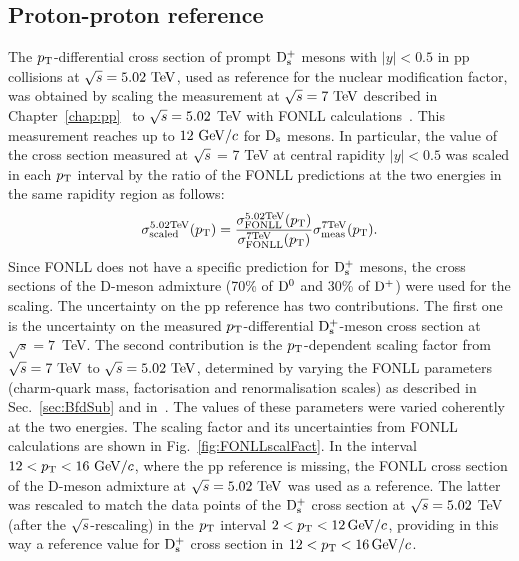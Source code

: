 \subsection{Proton-proton reference}
\label{sec:PPrefSyst}
The $p_{\rm T}$-differential cross section of prompt ${\rm D_s^+}$ mesons with 
$|y|<0.5$ in pp collisions at $\sqrt s=5.02~\mathrm{TeV}$, used as reference 
for the nuclear modification factor, was obtained by scaling the 
measurement at $\sqrt{s}=7~\mathrm{TeV}$ described in 
Chapter~\ref{chap:pp}~\cite{Acharya:2017jgo} to $\sqrt{s} = 5.02$ TeV 
with FONLL calculations~\cite{Cacciari:2012ny}. 
This measurement 
reaches up to $12~\mathrm{GeV}/c$ for ${\rm D_s}$ mesons.
In particular, the value of the cross section measured at $\sqrt{s}$ = 7 TeV 
at central rapidity $|y| < 0.5$ was scaled in each $p_{\rm T}$ interval by 
the ratio of the FONLL predictions at the two energies in the same rapidity region as follows:
\begin{equation}
\label{eq:scalingPP}
\sigma^{\rm 5.02 TeV}_{\rm scaled} (p_{\rm T}) = \frac{\sigma^{\rm 5.02 TeV}_{\rm FONLL} (p_{\rm T})}{\sigma^{\rm 7 TeV}_{\rm FONLL} (p_{\rm T})} \sigma^{\rm 7 TeV}_{\rm meas} (p_{\rm T}).
\end{equation}
Since FONLL does not have a specific prediction for ${\rm D_s^+}$
mesons, the cross sections of the D-meson admixture (70\% of ${\rm D^0}$ and 30\% of ${\rm D^+}$) were used for the
scaling. The uncertainty on the pp reference 
has two contributions. The first one is the uncertainty on the measured 
$p_{\rm T}$-differential ${\rm D_s^+}$-meson cross section at $\sqrt s=7$~TeV.
The second contribution is the $p_{\rm T}$-dependent scaling factor 
from $\sqrt{s}=7~\mathrm{TeV}$ to $\sqrt{s}=5.02~\mathrm{TeV}$, determined by varying
the FONLL parameters (charm-quark mass, factorisation and renormalisation scales) 
as described in Sec.~\ref{sec:BfdSub} and in~\cite{Averbeck:2011ga}. The values of these parameters were 
varied coherently at the two energies. The scaling factor 
and its uncertainties from FONLL calculations are shown in Fig.~\ref{fig:FONLLscalFact}.
In the interval $12<p_{\rm T}<16~\mathrm{GeV}/c$, where the pp reference is missing, the FONLL cross section of the D-meson admixture at 
$\sqrt s=5.02~\mathrm{TeV}$ was used as a reference. 
The latter was rescaled to match the data points of the ${\rm D_s^+}$ cross section at $\sqrt{s}=5.02 $ TeV (after the $\sqrt{s}$-rescaling)
in the $p_{\rm T}$ interval $2 < p_{\rm T} < 12 \, \mathrm{GeV}/c$, providing in this way a reference value for ${\rm D_s^+}$ cross section in  $12 < p_{\rm T} < 16 \, \mathrm{GeV}/c$.
